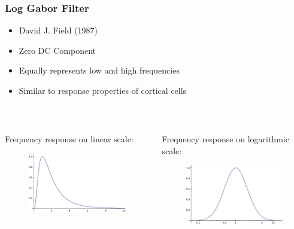 \documentclass{beamer}
\begin{document}
\begin{frame}
    [fragile] \frametitle{Log Gabor Filter}
    \begin{itemize}
        \item David J. Field (1987)
        \item Zero DC Component
        \item Equally represents low and high frequencies
        \item Similar to response properties of cortical cells
    \end{itemize}

\

    \begin{columns}
        \begin{column}{0.45\textwidth}
            Frequency response on linear scale:
            \begin{figure}
                [t] \centering
                \includegraphics[width=\textwidth]{gabor/freq_response_log_gabor.pdf} \label{fig:gabor}
            \end{figure}
        \end{column}
        \begin{column}{0.45\textwidth}
            Frequency response on logarithmic scale:
            \begin{figure}
                [t] \centering
                \includegraphics[width=\textwidth]{gabor/freq_response_log_gabor_log_scale.pdf} \label{fig:gabor}
            \end{figure}
        \end{column}
    \end{columns}
\end{frame}
\end{document}
